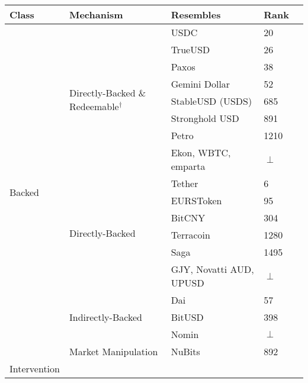 \begin{table}[t]
\centering

\begin{tabular}{|l|l|l|l|l|}

\hline
\rowcolor{lightgray}
\textbf{Class} & \textbf{Mechanism} & \textbf{Resembles} & Rank \\  \hline
\multirow{18}{*}{Backed}		
						& \multirow{8}{*}{Directly-Backed \& Redeemable$^{\dagger}$}	& USDC 			& 20 \\ \cline{3-4}
						&													& TrueUSD 		& 26 \\ \cline{3-4}	
						&													& Paxos 			& 38 \\ \cline{3-4}		
						&													& Gemini Dollar 	& 52 \\ \cline{3-4}
						&													& StableUSD (USDS) & 685 \\ \cline{3-4}
						&													& Stronghold USD 	& 891 \\ \cline{3-4}
						&													& Petro 			& 1210 \\ \cline{3-4}
						&	& \multicolumn{1}{p{5cm}|}{Ekon, WBTC, emparta} & $\perp$ \\ \cline{2-4}
						& \multirow{6}{*}{Directly-Backed}  							& Tether 			& 6 \\ \cline{3-4}
						&													& EURSToken 		& 95 \\ \cline{3-4}
						&													& BitCNY 			& 304 \\ \cline{3-4}
						&													& Terracoin 		& 1280 \\ \cline{3-4}
						&													& Saga 			& 1495 \\  \cline{3-4}
						&	& \multicolumn{1}{p{5cm}|}{GJY, Novatti AUD, UPUSD} & $\perp$ \\ \cline{2-4} 						
						& \multirow{3}{*}{Indirectly-Backed}							& Dai 			& 57 \\ \cline{3-4}
                                                &													& BitUSD 			& 398 \\  \cline{3-4}
                                                & 													& Nomin			& $\perp$ \\ \cline{2-4}
						& \multirow{1}{*}{Market Manipulation} 						& NuBits			& 892 \\ \cline{1-4}
\multirow{4}{*}{Intervention}                                                           


\end{tabular}
\end{table}
